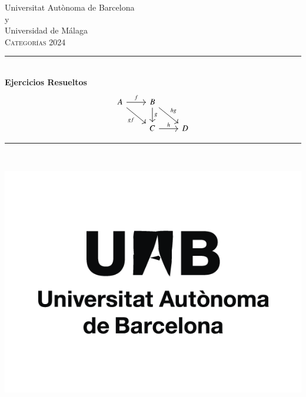 \documentclass[12pt, a4paper]{article}
\begin{document}
\begin{titlepage}
\center
\vspace*{\fill}

\Large Universitat Aut\`onoma de Barcelona\\%
\Large y\\
\Large Universidad de Málaga\\[1.5cm] %
\textsc{\Large Categorías 2024}\\[0.5cm] %

\rule{\linewidth}{0.5mm} \\[0.4cm]
{ \huge \bfseries Ejercicios Resueltos}\\[-0.8cm]
\[
\begin{tikzcd}
  A \arrow[r,"f"] \arrow[dr,"gf"swap] & B \arrow[d,"g"] \arrow[dr,"hg"]  \\
& C \arrow[r,"h"] & D
\end{tikzcd}
\]
\rule{\linewidth}{0.5mm} \\[1.5cm]

 



\vspace*{\fill}

\includegraphics[scale=0.25]{Logo_UAB.png}


\end{titlepage}
\end{document}
